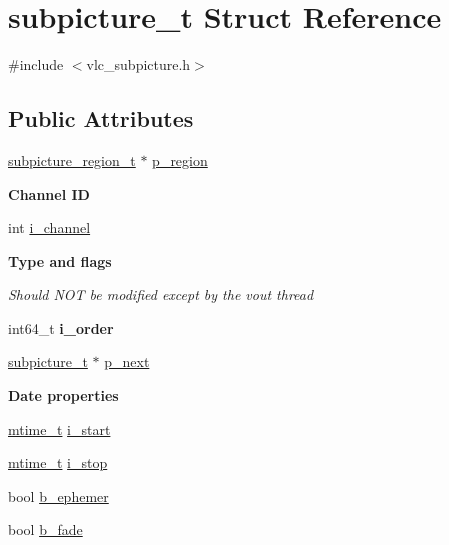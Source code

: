 \hypertarget{structsubpicture__t}{}\section{subpicture\+\_\+t Struct Reference}
\label{structsubpicture__t}


{\ttfamily \#include $<$vlc\+\_\+subpicture.\+h$>$}

\subsection*{Public Attributes}
\begin{DoxyCompactItemize}
\item 
\hyperlink{structsubpicture__region__t}{subpicture\+\_\+region\+\_\+t} $\ast$ \hyperlink{structsubpicture__t_ad091daa3477dc3603d83471a786824a1}{p\+\_\+region}
\end{DoxyCompactItemize}
\begin{Indent}\textbf{ Channel ID}\par
\begin{DoxyCompactItemize}
\item 
int \hyperlink{structsubpicture__t_acb53f3c2070e95b25fc80b69adc5723c}{i\+\_\+channel}
\end{DoxyCompactItemize}
\end{Indent}
\begin{Indent}\textbf{ Type and flags}\par
{\em Should N\+OT be modified except by the vout thread }\begin{DoxyCompactItemize}
\item 
\mbox{\label{structsubpicture__t_a9a317cd04e6bf507f3bdaced4a9fd92d}} 
int64\+\_\+t {\bfseries i\+\_\+order}
\item 
\hyperlink{structsubpicture__t}{subpicture\+\_\+t} $\ast$ \hyperlink{structsubpicture__t_a54d10f8d93fc0f176d32c53c59dbb04a}{p\+\_\+next}
\end{DoxyCompactItemize}
\end{Indent}
\begin{Indent}\textbf{ Date properties}\par
\begin{DoxyCompactItemize}
\item 
\hyperlink{vlc__common_8h_a996e47c5ea061215703c26738351279e}{mtime\+\_\+t} \hyperlink{structsubpicture__t_a4d7b8388139d7d8a1ad0ad9354d4700b}{i\+\_\+start}
\item 
\hyperlink{vlc__common_8h_a996e47c5ea061215703c26738351279e}{mtime\+\_\+t} \hyperlink{structsubpicture__t_a92078f5d576cdcd89056b16ed1c9007e}{i\+\_\+stop}
\item 
bool \hyperlink{structsubpicture__t_a7b1150266a7532d908effb27edff79bb}{b\+\_\+ephemer}
\item 
bool \hyperlink{structsubpicture__t_a84f0d741899c94122875aa3b16c41b2b}{b\+\_\+fade}
\end{DoxyCompactItemize}
\end{Indent}
